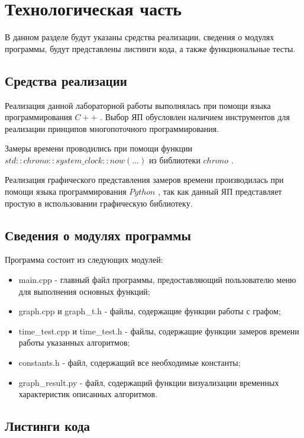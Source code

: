 \chapter{Технологическая часть}

В данном разделе будут указаны средства реализации, сведения о модулях программы, будут представлены листинги кода, а также функциональные тесты.

\section{Средства реализации}

Реализация данной лабораторной работы выполнялась при помощи языка программирования $C++$ \cite{c++}. Выбор ЯП обусловлен наличием инструментов для реализации принципов многопоточного программирования.

Замеры времени проводились при помощи функции $std::chrono::system\_clock::now(...)$ из библиотеки $chrono$ \cite{time}.

Реализация графического представления замеров времени производилась при помощи языка программирования $Python$ \cite{python}, так как данный ЯП представляет простую в использовании графическую библиотеку.

\section{Сведения о модулях программы}

Программа состоит из следующих модулей:

\begin{itemize}
	\item main.cpp - главный файл программы, предоставляющий пользователю меню для выполнения основных функций;
	\item graph.cpp и graph\_t.h - файлы, содержащие функции работы с графом;
	\item time\_test.cpp и time\_test.h - файлы, содержащие функции замеров времени работы указанных алгоритмов;
	\item constants.h - файл, содержащий все необходимые константы;
	\item graph\_result.py - файл, содержащий функции визуализации временных характеристик описанных алгоритмов.
\end{itemize}

\section{Листинги кода}

